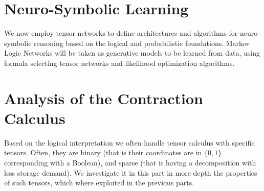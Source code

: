 \documentclass[aps,onecolumn,nofootinbib,pra]{article}
\begin{document}
\part{Neuro-Symbolic Learning}

We now employ tensor networks to define architectures and algorithms for neuro-symbolic reasoning based on the logical and probabilistic foundations.
Markov Logic Networks will be taken as generative models to be learned from data, using formula selecting tensor networks and likelihood optimization algorithms.















\part{Analysis of the Contraction Calculus}

Based on the logical interpretation we often handle tensor calculus with specific tensors.
Often, they are binary (that is their coordinates are in $\{0,1\}$ corresponding with a Boolean), and sparse (that is having a decomposition with less storage demand).
We investigate it in this part in more depth the properties of such tensors, which where exploited in the previous parts.




%






%







\appendix




\end{document}
